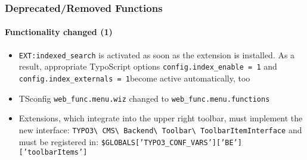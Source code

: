 \begin{frame}[fragile]
	\frametitle{Deprecated/Removed Functions}
	\framesubtitle{Functionality changed (1)}

	\begin{itemize}

		\item \texttt{EXT:indexed\_search} is activated as soon as the extension is installed.
			As a result, appropriate TypoScript options \small\texttt{config.index\_enable = 1}\normalsize
			and \small\texttt{config.index\_externals = 1}\normalsize become active automatically, too
		
		\item TSconfig \small\texttt{web\_func.menu.wiz}\normalsize\space
			changed to \small\texttt{web\_func.menu.functions}\normalsize

		\item Extensions, which integrate into the upper right toolbar, must implement the new interface:
			\small
				\texttt{TYPO3\textbackslash
					CMS\textbackslash
					Backend\textbackslash
					Toolbar\textbackslash
					ToolbarItemInterface}
			\normalsize\newline
			and must be registered in:
			\small
				\texttt{\$GLOBALS['TYPO3\_CONF\_VARS']['BE']['toolbarItems']}
			\normalsize

	\end{itemize}

\end{frame}


